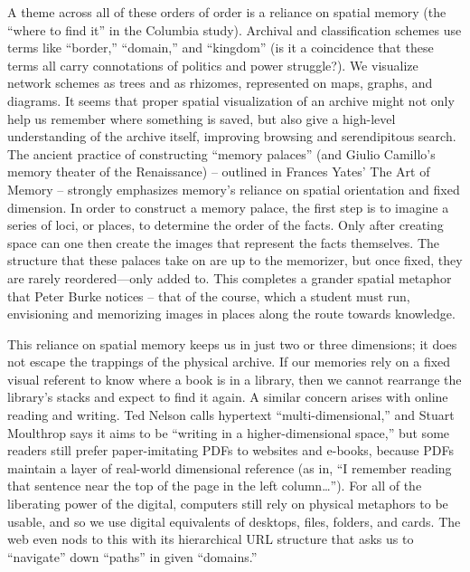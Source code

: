 A theme across all of these orders of order is a reliance on spatial memory (the “where to find it” in the Columbia study). Archival and classification schemes use terms like “border,” “domain,” and “kingdom” (is it a coincidence that these terms all carry connotations of politics and power struggle?). We visualize network schemes as trees and as rhizomes, represented on maps, graphs, and diagrams. It seems that proper spatial visualization of an archive might not only help us remember where something is saved, but also give a high-level understanding of the archive itself, improving browsing and serendipitous search.
The ancient practice of constructing “memory palaces” (and Giulio Camillo’s memory theater of the Renaissance) – outlined in Frances Yates’ The Art of Memory – strongly emphasizes memory’s reliance on spatial orientation and fixed dimension.  In order to construct a memory palace, the first step is to imagine a series of loci, or places, to determine the order of the facts. Only after creating space can one then create the images that represent the facts themselves. The structure that these palaces take on are up to the memorizer, but once fixed, they are rarely reordered—only added to. This completes a grander spatial metaphor that Peter Burke notices – that of the course, which a student must run, envisioning and memorizing images in places along the route towards knowledge.

This reliance on spatial memory keeps us in just two or three dimensions; it does not escape the trappings of the physical archive. If our memories rely on a fixed visual referent to know where a book is in a library, then we cannot rearrange the library’s stacks and expect to find it again. A similar concern arises with online reading and writing. Ted Nelson calls hypertext “multi-dimensional,” and Stuart Moulthrop says it aims to be “writing in a higher-dimensional space,”  but some readers still prefer paper-imitating PDFs to websites and e-books, because PDFs maintain a layer of real-world dimensional reference (as in, “I remember reading that sentence near the top of the page in the left column…”). For all of the liberating power of the digital, computers still rely on physical metaphors to be usable, and so we use digital equivalents of desktops, files, folders, and cards. The web even nods to this with its hierarchical URL structure that asks us to “navigate” down “paths” in given “domains.”

